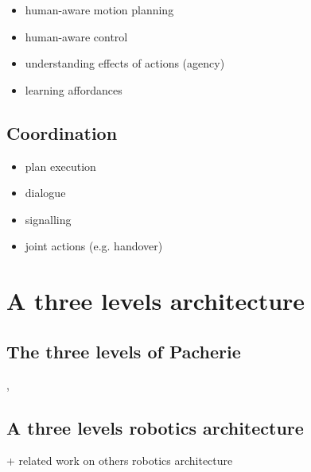\documentclass[english,a4paper,11pt,twoside]{StyleThese}
\begin{document}
\begin{itemize}
\item human-aware motion planning
\item human-aware control
\item understanding effects of actions (agency)
\item learning affordances
\end{itemize}


\subsection{Coordination}

\label{subsec:coordination_robot}

\begin{itemize}
\item plan execution
\item dialogue
\item signalling
\item joint actions (e.g. handover)
\end{itemize}

\section{A three levels architecture}

\subsection{The three levels of Pacherie}

\cite{pacherie2008phenomenology}, \cite{pacherie2011phenomenology}

\subsection{A three levels robotics architecture}

+ related work on others robotics architecture


\ifdefined{}
\else


\end{document}
